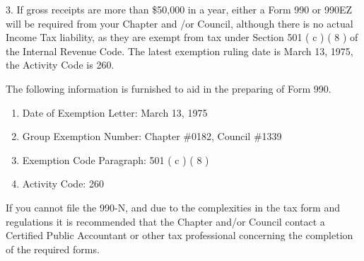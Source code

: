 \documentclass[letterpaper]{article}
\begin{document}
	3. If gross receipts are more than \$50,000 in a year, either a Form 990 or 990EZ will be required from your Chapter and /or Council, although there is no actual Income Tax liability, as they are exempt from tax under Section 501 ( c ) ( 8 ) of the Internal Revenue Code. The latest exemption ruling date is March 13, 1975, the Activity Code is 260.
	
	The following information is furnished to aid in the preparing of Form 990.
	
	\begin{enumerate}
		\item Date of Exemption Letter: March 13, 1975
		\item Group Exemption Number: Chapter \#0182, Council \#1339
		\item Exemption Code Paragraph: 501 ( c ) ( 8 )
		\item Activity Code: 260
	\end{enumerate}

	If you cannot file the 990-N, and due to the complexities in the tax form and regulations it is recommended that the Chapter and/or Council contact a Certified Public Accountant or other tax professional concerning the completion of the required forms.
	
\end{document}
